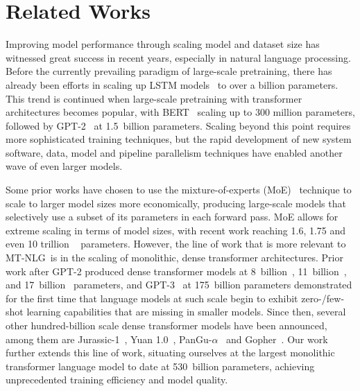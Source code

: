 \documentclass[11pt]{article}
\newcommand{\ours}{MT-NLG}
\begin{document}
\section{Related Works}


Improving model performance through scaling model and dataset size has witnessed great success in recent years, especially in natural language processing. Before the currently prevailing paradigm of large-scale pretraining, there has already been efforts in scaling up LSTM models~\citep{Jzefowicz2016ExploringTL} to over a billion parameters. This trend is continued when large-scale pretraining with transformer architectures becomes popular, with BERT~\citep{Devlin2019BERTPO} scaling up to 300 million parameters, followed by GPT-2~\citep{gpt2-radford2019language} at 1.5~billion parameters. Scaling beyond this point requires more sophisticated training techniques, but the rapid development of new system software, data, model and pipeline parallelism techniques have enabled another wave of even larger models. 

Some prior works have chosen to use the mixture-of-experts (MoE)~\citep{Lepikhin2021GShardSG,Lin2021M6AC,Shazeer2017OutrageouslyLN} technique to scale to larger model sizes more economically, producing large-scale models that selectively use a subset of its parameters in each forward pass. MoE allows for extreme scaling in terms of model sizes, with recent work reaching 1.6, 1.75
and even 10 trillion ~\citep{wudao2p0,Fedus2021SwitchTS,Lin2021M610TAS} parameters. However, the line of work that is more relevant to \ours~is in the scaling of monolithic, dense transformer architectures. Prior work after GPT-2 produced dense transformer models at 8~billion~\citep{megatron-DBLP:journals/corr/abs-1909-08053}, 11~billion~\citep{t5}, and 17~billion~\citep{tnlg17b} parameters, and GPT-3~\citep{brown2020language} at 175~billion parameters demonstrated for the first time that language models at such scale begin to exhibit zero-/few-shot learning capabilities that are missing in smaller models. Since then, several other hundred-billion scale dense transformer models have been announced, among them are Jurassic-1~\citep{lieber_sharir_lenz_shoham}, Yuan 1.0~\citep{Wu2021Yuan}, PanGu-$\alpha$~\citep{Zeng2021PanGuLA} and Gopher~\citep{Rae2021Gopher}.
Our work further extends this line of work, situating ourselves at the largest monolithic transformer language model to date at 530~billion parameters, achieving unprecedented training efficiency and model quality.
\end{document}
